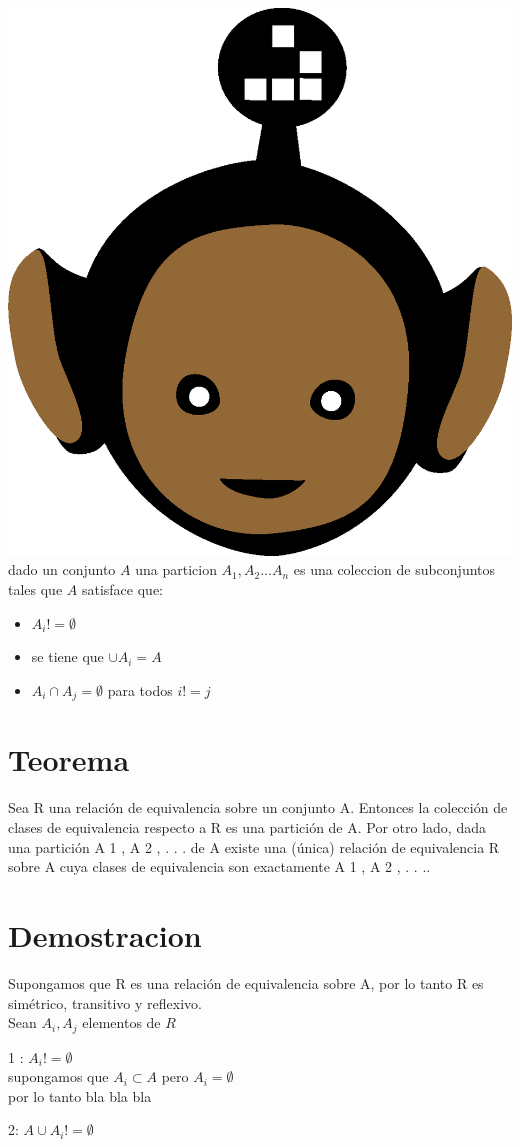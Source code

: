 \documentclass[10pt,a4paper]{article} %
\begin{document}
    \title{\rmfamily\normalfont{}}
    \author{}
    \date{\today} 
    
    \maketitle
     

    \includegraphics[width=0.1\linewidth]{negro_cara.png}
    \\
    dado un conjunto $ A  $  una particion $ {A_1 , A_2 ... A_n}  $  es una coleccion de subconjuntos tales que $ A  $ satisface que:
    \begin{itemize}
        \item {$A_i != \emptyset$} 
        \item {se tiene que $ \cup A_i = A   $ } 
        \item {$ A_i \cap A_j   = \emptyset$ para todos $ i != j  $  } 
    \end{itemize}	
    \section{Teorema}
        Sea R una relación de equivalencia sobre un conjunto A. Entonces la
        colección de clases de equivalencia respecto a R es una partición de
        A.
        Por otro lado, dada una partición {A 1 , A 2 , . . .} de A existe una
        (única) relación de equivalencia R sobre A cuya clases de
        equivalencia son exactamente A 1 , A 2 , . . ..
    \section{Demostracion}
        Supongamos que R es una relación de equivalencia sobre A, por lo tanto
        R es simétrico, transitivo y reflexivo. 
        \\Sean $ A_i , A_j  $ elementos de $ R  $ 
        \item {1 : $ A_i != \emptyset$ }  
        \\ supongamos que $ A_i \subset A  $  pero $ A_i = \emptyset  $  \\
        por lo tanto bla bla bla
        \item {2: $ A \cup A_i  != \emptyset $  }\\
            \begin{enumerate}
                
            \end{enumerate}
            
\end{document}
